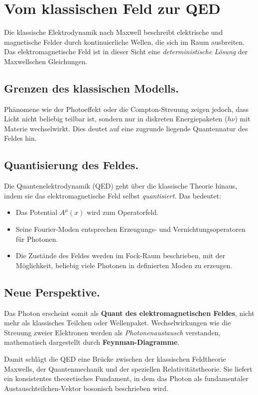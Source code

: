 \section{Vom klassischen Feld zur QED}
\label{anhangA:feld_zu_qed}

Die klassische Elektrodynamik nach Maxwell beschreibt elektrische und 
magnetische Felder durch kontinuierliche Wellen, die sich im Raum ausbreiten. 
Das elektromagnetische Feld ist in dieser Sicht eine 
\emph{deterministische Lösung} der Maxwellschen Gleichungen. 

\subsection*{Grenzen des klassischen Modells.}
Phänomene wie der Photoeffekt oder die Compton-Streuung zeigen jedoch,
dass Licht nicht beliebig teilbar ist, sondern nur in diskreten 
Energiepaketen (\( h\nu \)) mit Materie wechselwirkt. 
Dies deutet auf eine zugrunde liegende Quantennatur des Feldes hin.

\subsection*{Quantisierung des Feldes.}
Die Quantenelektrodynamik (QED) geht über die klassische Theorie hinaus, 
indem sie das elektromagnetische Feld selbst \emph{quantisiert}. 
Das bedeutet:
\begin{itemize}
	\item Das Potential \( A^\mu(x) \) wird zum Operatorfeld.
	\item Seine Fourier-Moden entsprechen Erzeugungs- und Vernichtungsoperatoren 
	für Photonen.
	\item Die Zustände des Feldes werden im Fock-Raum beschrieben, 
	mit der Möglichkeit, beliebig viele Photonen in definierten 
	Moden zu erzeugen.
\end{itemize}

\subsection*{Neue Perspektive.}
Das Photon erscheint somit als \textbf{Quant des elektromagnetischen Feldes}, 
nicht mehr als klassisches Teilchen oder Wellenpaket. 
Wechselwirkungen wie die Streuung zweier Elektronen werden als 
\emph{Photonenaustausch} verstanden, mathematisch dargestellt 
durch \textbf{Feynman-Diagramme}. 

\medskip
Damit schlägt die QED eine Brücke zwischen der klassischen Feldtheorie Maxwells, 
der Quantenmechanik und der speziellen Relativitätstheorie. 
Sie liefert ein konsistentes theoretisches Fundament, in dem das Photon 
als fundamentaler Austauschteilchen-Vektor bosonisch beschrieben wird.

